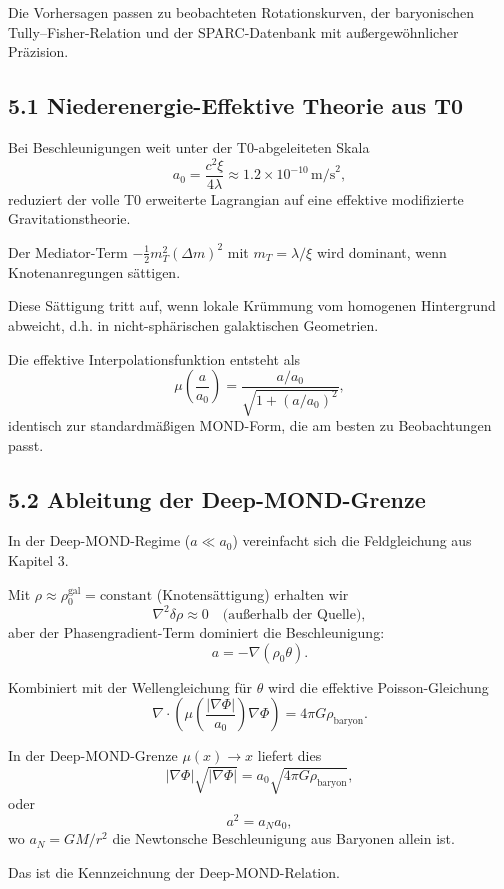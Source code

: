 \documentclass[12pt,a4paper]{article}
\begin{document}
	Die Vorhersagen passen zu beobachteten Rotationskurven, der baryonischen Tully–Fisher-Relation und der SPARC-Datenbank mit außergewöhnlicher Präzision.
	
	\subsection{5.1 Niederenergie-Effektive Theorie aus T0}
	
	Bei Beschleunigungen weit unter der T0-abgeleiteten Skala
	\[
	a_0 = \frac{c^2 \xi}{4 \lambda} \approx 1.2 \times 10^{-10} \, \text{m/s}^2,
	\]
	reduziert der volle T0 erweiterte Lagrangian auf eine effektive modifizierte Gravitationstheorie.
	
	Der Mediator-Term $-\frac{1}{2} m_T^2 (\Delta m)^2$ mit $m_T = \lambda / \xi$ wird dominant, wenn Knotenanregungen sättigen.
	
	Diese Sättigung tritt auf, wenn lokale Krümmung vom homogenen Hintergrund abweicht, d.h. in nicht-sphärischen galaktischen Geometrien.
	
	Die effektive Interpolationsfunktion entsteht als
	\[
	\mu\left(\frac{a}{a_0}\right) = \frac{a / a_0}{\sqrt{1 + (a / a_0)^2}},
	\]
	identisch zur standardmäßigen MOND-Form, die am besten zu Beobachtungen passt.
	
	\subsection{5.2 Ableitung der Deep-MOND-Grenze}
	
	In der Deep-MOND-Regime ($a \ll a_0$) vereinfacht sich die Feldgleichung aus Kapitel 3.
	
	Mit $\rho \approx \rho_0^{\text{gal}} = \text{constant}$ (Knotensättigung) erhalten wir
	\[
	\nabla^2 \delta \rho \approx 0 \quad \text{(außerhalb der Quelle)},
	\]
	aber der Phasengradient-Term dominiert die Beschleunigung:
	\[
	a = -\nabla (\rho_0 \theta).
	\]
	
	Kombiniert mit der Wellengleichung für $\theta$ wird die effektive Poisson-Gleichung
	\[
	\nabla \cdot \left( \mu\left(\frac{|\nabla \Phi|}{a_0}\right) \nabla \Phi \right) = 4\pi G \rho_{\text{baryon}}.
	\]
	
	In der Deep-MOND-Grenze $\mu(x) \to x$ liefert dies
	\[
	|\nabla \Phi| \sqrt{|\nabla \Phi|} = a_0 \sqrt{4\pi G \rho_{\text{baryon}}},
	\]
	oder
	\[
	a^2 = a_N a_0,
	\]
	wo $a_N = GM/r^2$ die Newtonsche Beschleunigung aus Baryonen allein ist.
	
	Das ist die Kennzeichnung der Deep-MOND-Relation.
	
\end{document}
